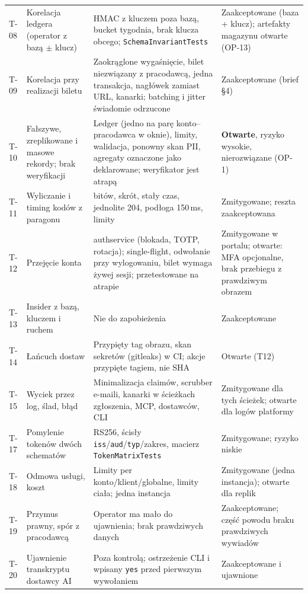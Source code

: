 \begin{longtable}{@{}>{\raggedright\arraybackslash}p{1.1cm}>{\raggedright\arraybackslash}p{3.2cm}>{\raggedright\arraybackslash}p{6.4cm}>{\raggedright\arraybackslash}p{3.0cm}@{}}
\addlinespace
T-08 & Korelacja ledgera (operator z bazą $\pm$ klucz) &
HMAC z kluczem poza bazą, bucket tygodnia, brak klucza obcego; \texttt{SchemaInvariantTests} &
Zaakceptowane (baza + klucz); artefakty magazynu otwarte (OP-13) \\
\addlinespace
T-09 & Korelacja przy realizacji biletu &
Zaokrąglone wygaśnięcie, bilet niezwiązany z pracodawcą, jedna transakcja, nagłówek zamiast URL, kanarki; batching i jitter świadomie odrzucone &
Zaakceptowane (brief §4) \\
\addlinespace
T-10 & Fałszywe, zreplikowane i masowe rekordy; brak weryfikacji &
Ledger (jedno na parę konto--pracodawca w oknie), limity, walidacja, ponowny skan PII, agregaty oznaczone jako deklarowane; weryfikator jest atrapą &
\textbf{Otwarte}, ryzyko wysokie, nierozwiązane (OP-1) \\
\addlinespace
T-11 & Wyliczanie i timing kodów z paragonu &
256 bitów, skrót, stały czas, jednolite 204, podłoga 150\,ms, limity &
Zmitygowane; reszta zaakceptowana \\
\addlinespace
T-12 & Przejęcie konta &
authservice (blokada, TOTP, rotacja); single-flight, odwołanie przy wylogowaniu, bilet wymaga żywej sesji; przetestowane na atrapie &
Zmitygowane w portalu; otwarte: MFA opcjonalne, brak przebiegu z prawdziwym obrazem \\
\addlinespace
T-13 & Insider z bazą, kluczem i ruchem &
Nie do zapobieżenia &
Zaakceptowane \\
\addlinespace
T-14 & Łańcuch dostaw &
Przypięty tag obrazu, skan sekretów (gitleaks) w CI; akcje przypięte tagiem, nie SHA &
Otwarte (T12) \\
\addlinespace
T-15 & Wyciek przez log, ślad, błąd &
Minimalizacja claimów, scrubber e-maili, kanarki w ścieżkach zgłoszenia, MCP, dostawców, CLI &
Zmitygowane dla tych ścieżek; otwarte dla logów platformy \\
\addlinespace
T-17 & Pomylenie tokenów dwóch schematów &
RS256, ścisły \texttt{iss}/\texttt{aud}/\texttt{typ}/zakres, macierz \texttt{TokenMatrixTests} &
Zmitygowane; ryzyko niskie \\
\addlinespace
T-18 & Odmowa usługi, koszt &
Limity per konto/klient/globalne, limity ciała; jedna instancja &
Zmitygowane (jedna instancja); otwarte dla replik \\
\addlinespace
T-19 & Przymus prawny, spór z pracodawcą &
Operator ma mało do ujawnienia; brak prawdziwych danych &
Zaakceptowane; część powodu braku prawdziwych wywiadów \\
\addlinespace
T-20 & Ujawnienie transkryptu dostawcy AI &
Poza kontrolą; ostrzeżenie CLI i wpisany \texttt{yes} przed pierwszym wywołaniem &
Zaakceptowane i ujawnione \\
\end{longtable}

